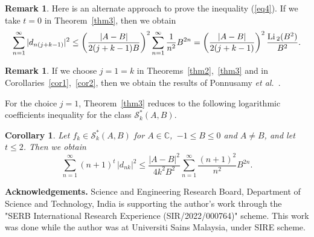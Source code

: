 \documentclass[12pt]{amsart}
\numberwithin{equation}{section}
\newtheorem{cor}[thm]{Corollary}
\theoremstyle{definition}
\newtheorem{rem}[thm]{Remark}
\numberwithin{equation}{section}
\newtheorem{conj}[thm]{Conjecture}
\newcommand{\bcor}{\begin{cor}}
\newcommand{\ecor}{\end{cor}}
\newcommand{\brem}{\begin{rem}}
\newcommand{\erem}{\end{rem}}
\newcommand{\bconj}{\begin{conj}}
\newcommand{\econj}{\end{conj}}
\newcommand{\T}{{\mathcal T}}
\newcommand{\es}{{\mathcal S}}
\newcommand{\IC}{{\mathbb C}}
\begin{document}
\brem
Here is an alternate approach to prove the inequality (\ref{eq4}). If we take $t=0$ in Theorem~\ref{thm3}, then we obtain
 $$ \sum_{n=1}^{\infty} |d_{n(j+k-1)}|^2 \le  \left(\frac{|A-B|}{2(j+k-1)B}\right)^2  \sum_{n=1}^{\infty}\frac{1}{n^2} B^{2n}
= \left(\frac{|A-B|}{2(j+k-1)}\right)^2  \frac{{\rm Li\,}_{2}(B^2)}{B^2}. 
$$
\erem
\brem
If we choose $j=1=k$ in Theorems~\ref{thm2},~\ref{thm3} and in Corollaries~\ref{cor1},~\ref{cor2}, then we obtain the results of 
Ponnusamy {\em et al.}~\cite{PSW1}.
\erem
For the choice $j=1$, Theorem~\ref{thm3} reduces to the following logarithmic coefficients inequality for the class $\es^*_k(A,B)$.
\bcor
Let $f_{k} \in \es^*_k(A,B)$ for $A\in\IC $,\,  $-1\le B\le 0$ and $A\neq B$, and let $t\le 2$. Then we obtain
$$ \sum_{n=1}^{\infty} (n+1)^t \, |d_{nk}|^{2} \leq \frac{|A-B|^2}{4k^2B^2} \sum_{n=1}^{\infty} \frac{(n+1)^2}{n^2} B^{2n}.
$$
\ecor



\bigskip
\noindent
{\bf Acknowledgements.} 
Science and Engineering Research Board, Department of Science and Technology, India is supporting the author's work through the "SERB International Research Experience (SIR/2022/000764)" scheme. This work was done while the author was at Universiti Sains Malaysia, under SIRE scheme.
\end{document}
